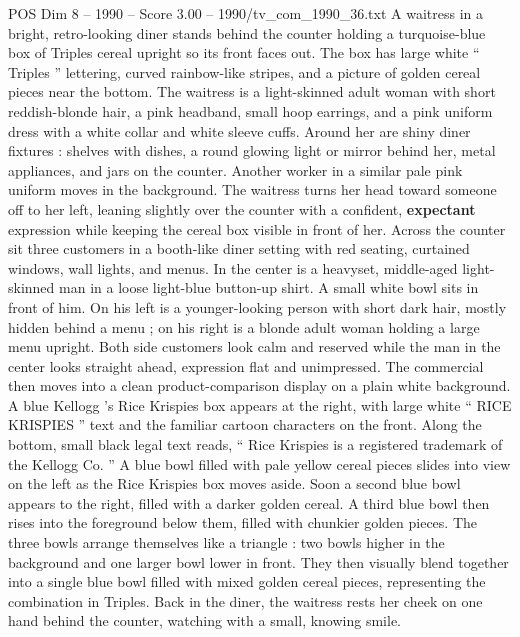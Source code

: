 \begin{textsample}{POS Dim 8 – 1990 – Score 3.00 – 1990/tv\_com\_1990\_36.txt}  \label{ex:f8_pos_070}
A waitress in a bright, retro-looking diner stands behind the counter holding a turquoise-blue box of Triples cereal upright so its front faces out.
The box has large white “ Triples ” lettering, curved rainbow-like stripes, and a picture of golden cereal pieces near the bottom.
The waitress is a light-skinned adult woman with short reddish-blonde hair, a pink headband, small hoop earrings, and a pink uniform dress with a white collar and white sleeve cuffs.
Around her are shiny diner fixtures : shelves with dishes, a round glowing light or mirror behind her, metal appliances, and jars on the counter.
Another worker in a similar pale pink uniform moves in the background.
The waitress turns her head toward someone off to her left, leaning slightly over the counter with a confident, \textbf{expectant} expression while keeping the cereal box visible in front of her.
Across the counter sit three customers in a booth-like diner setting with red seating, curtained windows, wall lights, and menus.
In the center is a heavyset, middle-aged light-skinned man in a loose light-blue button-up shirt.
A small white bowl sits in front of him.
On his left is a younger-looking person with short dark hair, mostly hidden behind a menu ; on his right is a blonde adult woman holding a large menu upright.
Both side customers look calm and reserved while the man in the center looks straight ahead, expression flat and unimpressed.
The commercial then moves into a clean product-comparison display on a plain white background.
A blue Kellogg ’s Rice Krispies box appears at the right, with large white “ RICE KRISPIES ” text and the familiar cartoon characters on the front.
Along the bottom, small black legal text reads, “ Rice Krispies is a registered trademark of the Kellogg Co. ” A blue bowl filled with pale yellow cereal pieces slides into view on the left as the Rice Krispies box moves aside.
Soon a second blue bowl appears to the right, filled with a darker golden cereal.
A third blue bowl then rises into the foreground below them, filled with chunkier golden pieces.
The three bowls arrange themselves like a triangle : two bowls higher in the background and one larger bowl lower in front.
They then visually blend together into a single blue bowl filled with mixed golden cereal pieces, representing the combination in Triples.
Back in the diner, the waitress rests her cheek on one hand behind the counter, watching with a small, knowing smile.

\end{textsample}
